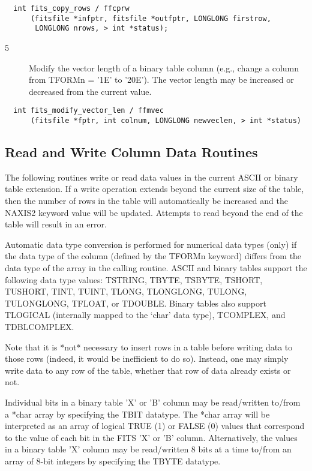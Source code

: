 \documentclass[11pt]{book}
\begin{document}
\begin{verbatim}
  int fits_copy_rows / ffcprw
      (fitsfile *infptr, fitsfile *outfptr, LONGLONG firstrow,
       LONGLONG nrows, > int *status);
\end{verbatim}

\begin{description}
\item[5 ] Modify the vector length of a binary table column (e.g.,
    change a column from TFORMn = '1E' to '20E').  The vector
   length may be increased or decreased from the current value. \label{ffmvec}
\end{description}

\begin{verbatim}
  int fits_modify_vector_len / ffmvec
      (fitsfile *fptr, int colnum, LONGLONG newveclen, > int *status)
\end{verbatim}

\subsection{Read and Write Column Data Routines}

The following routines write or read data values in the current ASCII
or binary table extension.  If a write operation extends beyond the
current size of the table, then the number of rows in the table will
automatically be increased and the NAXIS2 keyword value will be
updated.  Attempts to read beyond the end of the table will result in
an error.

Automatic data type conversion is performed for numerical data types
(only) if the data type of the column (defined by the TFORMn keyword)
differs from the data type of the array in the calling routine.  ASCII and binary
tables support the following data type values:  TSTRING, TBYTE, TSBYTE, TSHORT,
TUSHORT, TINT, TUINT, TLONG, TLONGLONG, TULONG, TULONGLONG, TFLOAT, or TDOUBLE.
Binary tables also support TLOGICAL (internally mapped to the `char'
data type), TCOMPLEX, and TDBLCOMPLEX.

Note that it is *not* necessary to insert rows in a table before
writing data to those rows (indeed, it would be inefficient to do so).
Instead, one may simply write data to any row of the table, whether that
row of data already exists or not.

Individual bits in a binary table 'X' or 'B' column may be read/written
to/from a *char array by specifying the TBIT datatype.  The *char
array will be interpreted as an array of logical TRUE (1) or FALSE (0)
values that correspond to the value of each bit in the FITS 'X' or 'B' column.
Alternatively, the values in a binary table 'X' column may be read/written
8 bits at a time to/from an array of 8-bit integers by specifying the
TBYTE datatype.
\end{document}
